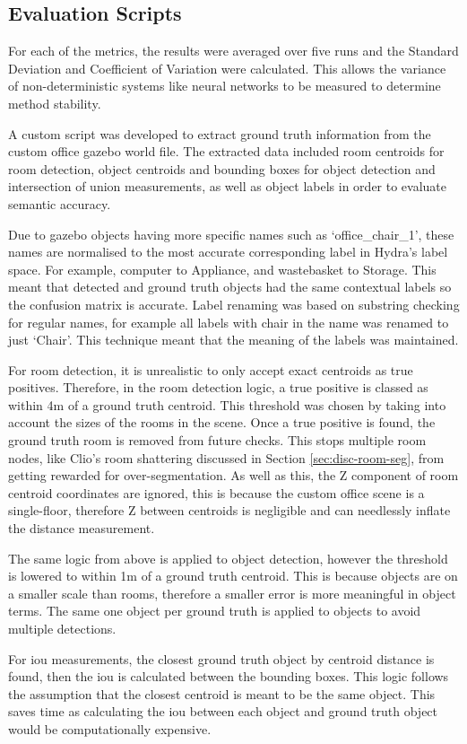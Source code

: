 \subsection{Evaluation Scripts}\label{sec:sim-eval-scripts}

For each of the metrics, the results were averaged over five runs and the Standard Deviation and Coefficient of Variation were calculated. This allows the variance of non-deterministic systems like neural networks to be measured to determine method stability.

A custom script was developed to extract ground truth information from the custom office gazebo world file. The extracted data included room centroids for room detection, object centroids and bounding boxes for object detection and intersection of union measurements, as well as object labels in order to evaluate semantic accuracy. 

Due to gazebo objects having more specific names such as ‘office\_chair\_1’, these names are normalised to the most accurate corresponding label in Hydra’s label space. For example, computer to Appliance, and wastebasket to Storage. This meant that detected and ground truth objects had the same contextual labels so the confusion matrix is accurate. Label renaming was based on substring checking for regular names, for example all labels with chair in the name was renamed to just ‘Chair’. This technique meant that the meaning of the labels was maintained.

For room detection, it is unrealistic to only accept exact centroids as true positives. Therefore, in the room detection logic, a true positive is classed as within 4m of a ground truth centroid. This threshold was chosen by taking into account the sizes of the rooms in the scene. Once a true positive is found, the ground truth room is removed from future checks. This stops multiple room nodes, like Clio’s room shattering discussed in Section \ref{sec:disc-room-seg}, from getting rewarded for over-segmentation. As well as this, the Z component of room centroid coordinates are ignored, this is because the custom office scene is a single-floor, therefore Z between centroids is negligible and can needlessly inflate the distance measurement.

The same logic from above is applied to object detection, however the threshold is lowered to within 1m of a ground truth centroid. This is because objects are on a smaller scale than rooms, therefore a smaller error is more meaningful in object terms. The same one object per ground truth is applied to objects to avoid multiple detections.

For \gls{iou} measurements, the closest ground truth object by centroid distance is found, then the \gls{iou} is calculated between the bounding boxes. This logic follows the assumption that the closest centroid is meant to be the same object. This saves time as calculating the \gls{iou} between each object and ground truth object would be computationally expensive.

